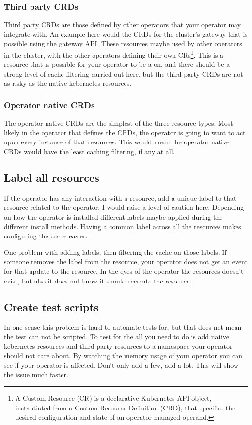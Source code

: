 \subsubsection{Third party CRDs}
Third party CRDs are those defined by other operators that your operator may integrate with.
An example here would the CRDs for the cluster's gateway that is possible using the gateway API\cite{noauthor_gateway_nodate}.
These resources maybe used by other operators in the cluster, with the other operators defining their own CRs\footnote{A Custom Resource (CR) is a declarative Kubernetes API object, instantiated from a Custom Resource Definition (CRD), that specifies the desired configuration and state of an operator-managed operand.}.
This is a resource that is possible for your operator to be a \nn{} on, and there should be a strong level of cache filtering carried out here, but the third party CRDs are not as risky as the native kebernetes resources.


\subsubsection{Operator native CRDs}
The operator native CRDs are the simplest of the three resource types.
Most likely in the operator that defines the CRDs, the operator is going to want to act upon every instance of that resources.
This would mean the operator native CRDs would have the least caching filtering, if any at all.


\subsection{Label all resources}
\label{sec:fix:label}
If the operator has any interaction with a resource, add a unique label\cite{noauthor_labels_nodate} to that resource related to the operator.
I would raise a level of caution here.
Depending on how the operator is installed different labels maybe applied during the different install methods.
Having a common label across all the resources makes configuring the cache easier.

One problem with adding labels, then filtering the cache on those labels.
If someone removes the label from the resource, your operator does not get an event for that update to the resource.
In the eyes of the operator the resources doesn't exist, but also it does not know it should recreate the resource.

\subsection{Create test scripts}
In one sense this problem is hard to automate tests for, but that does not mean the test can not be scripted.
To test for the \nn{} all you need to do is add native kebernetes resources and third party resources to a namespace your operator should not care about.
By watching the memory usage of your operator you can see if your operator is affected.
Don't only add a few, add a lot.
This will show the issue much faster.

